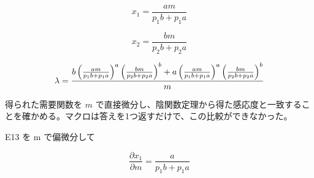 \documentclass[dvipdfmx,a4paper,11pt]{jsarticle}
\begin{document}
\begin{equation}
  x_{1} = \frac{a m}{p_{1} b+p_{1} a}
  \label{eq:E13}
\end{equation}

\begin{equation}
  x_{2} = \frac{b m}{p_{2} b+p_{2} a}
  \label{eq:E14}
\end{equation}

\begin{equation}
  \lambda = {{b \left(\frac{a m}{p_{1} b+p_{1} a}\right)^{a} \left(\frac{b m}{p_{2} b+p_{2} a}\right)^{b}+a \left(\frac{a m}{p_{1} b+p_{1} a}\right)^{a} \left(\frac{b m}{p_{2} b+p_{2} a}\right)^{b}}\over{m}}
  \label{eq:E15}
\end{equation}

得られた需要関数を $m$ で直接微分し、陰関数定理から得た感応度と一致することを確かめる。マクロは答えを1つ返すだけで、この比較ができなかった。

E13 を m で偏微分して

\begin{equation}
  \frac{\partial x_1}{\partial m} = \frac{a}{p_{1} b+p_{1} a}
  \label{eq:E16}
\end{equation}
\end{document}
